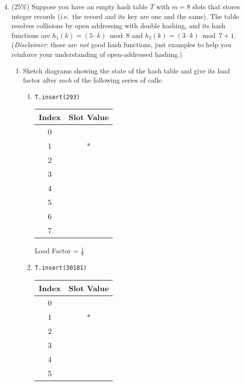 \documentclass[11pt]{article}
\begin{document}
\begin{enumerate}
\setcounter{enumi}{3}
\item (25\%)
Suppose you have an empty hash table $T$ with $m = 8$ slots that stores
integer records (i.e.\ the record and its key are one and the same).
The table resolves collisions by open addressing with double hashing,
and its hash functions are $h_1(k) = (5 \cdot k) \bmod 8$ and
$h_2(k) = (3 \cdot k) \bmod 7 + 1$.  (\textit{Disclaimer}: these are
\emph{not} good hash functions, just examples to help you reinforce
your understanding of open-addressed hashing.)

\begin{enumerate}
\item

Sketch diagrams showing the state of the hash table and give its load
factor after \emph{each} of the following series of calls:
\begin{enumerate}
\item 
\begin{verbatim}
T.insert(293)
\end{verbatim}
\begin{center}
\begin{tabular}{|c | c|}
\hline
Index & Slot Value\\
\hline
0 & \\
\hline
1 & * \\
\hline
2 & \\
\hline
3 & \\
\hline
4 & \\
\hline
5 & \\
\hline
6 & \\
\hline
7 &  \\
\hline
\end{tabular}
\end{center}
Load Factor = $\frac{1}{8}$
\item
\begin{verbatim}
T.insert(30181)
\end{verbatim}
\begin{center}
\begin{tabular}{|c | c|}
\hline
Index & Slot Value\\
\hline
0 & \\
\hline
1 & * \\
\hline
2 & \\
\hline
3 & \\
\hline
4 & \\
\hline
5 & \\

\end{tabular}
\end{center}
\end{enumerate}
\end{enumerate}
\end{enumerate}
\end{document}

